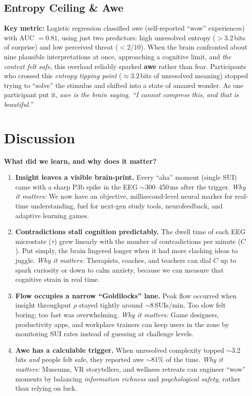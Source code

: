 \documentclass[12pt,a4paper]{article}
\begin{document}
\subsection{Entropy Ceiling \& Awe}
\noindent\textbf{Key metric:} Logistic regression classified awe (self-reported ``wow'' experiences) with AUC $= 0.81$, using just two predictors: high unresolved entropy ($>3.2$\,bits of surprise) and low perceived threat ($<2/10$). When the brain confronted about nine plausible interpretations at once, approaching a cognitive limit, and \emph{the context felt safe}, this overload reliably sparked \textbf{awe} rather than fear. Participants who crossed this \emph{entropy tipping point} ($\approx3.2$\,bits of unresolved meaning) stopped trying to ``solve'' the stimulus and shifted into a state of amazed wonder. As one participant put it, \emph{awe is the brain saying, ``I cannot compress this, and that is beautiful.''}

\section{Discussion}
\noindent\textbf{What did we learn, and why does it matter?}
\begin{enumerate}[leftmargin=*]
  \item \textbf{Insight leaves a visible brain-print.} Every ``aha'' moment (single SUI) came with a sharp P3b spike in the EEG $\sim$300--450\,ms after the trigger. \emph{Why it matters:} We now have an objective, millisecond-level neural marker for real-time understanding, fuel for next-gen study tools, neurofeedback, and adaptive learning games.
  \item \textbf{Contradictions stall cognition predictably.} The dwell time of each EEG microstate ($\tau$) grew linearly with the number of contradictions per minute ($C$). Put simply, the brain lingered longer when it had more clashing ideas to juggle. \emph{Why it matters:} Therapists, coaches, and teachers can dial $C$ up to spark curiosity or down to calm anxiety, because we can measure that cognitive strain in real time.
  \item \textbf{Flow occupies a narrow ``Goldilocks'' lane.} Peak flow occurred when insight throughput $\rho$ stayed tightly around $\sim$8\,SUIs/min. Too slow felt boring; too fast was overwhelming. \emph{Why it matters:} Game designers, productivity apps, and workplace trainers can keep users in the zone by monitoring SUI rates instead of guessing at challenge levels.
  \item \textbf{Awe has a calculable trigger.} When unresolved complexity topped $\sim$3.2\,bits \emph{and} people felt safe, they reported awe $\sim$81\% of the time. \emph{Why it matters:} Museums, VR storytellers, and wellness retreats can engineer ``wow'' moments by balancing \emph{information richness} and \emph{psychological safety}, rather than relying on luck.
\end{enumerate}
\end{document}
